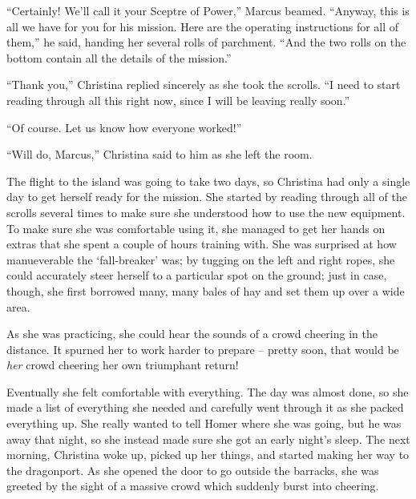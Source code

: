 \documentclass[showtrims,b6paper,draft,10pt]{memoir}
\begin{document}
``Certainly!  We'll call it your Sceptre of Power,''  Marcus beamed.  ``Anyway, this is all we have for you for his mission.  Here are the operating instructions for all of them,'' he said, handing her several rolls of parchment.  ``And the two rolls on the bottom contain all the details of the mission.''

``Thank you,'' Christina replied sincerely as she took the scrolls.  ``I need to start reading through all this right now, since I will be leaving really soon.''

``Of course.  Let us know how everyone worked!''

``Will do, Marcus,''  Christina said to him as she left the room.

\timeskip


The flight to the island was going to take two days, so Christina had only a single day to get herself ready for the mission.  She started by reading through all of the scrolls several times to make sure she understood how to use the new equipment.  To make sure she was comfortable using it, she managed to get her hands on extras that she spent a couple of hours training with.  She was surprised at how manueverable the `fall-breaker' was;  by tugging on the left and right ropes, she could accurately steer herself to a particular spot on the ground;  just in case, though, she first borrowed many, many bales of hay and set them up over a wide area.

As she was practicing, she could hear the sounds of a crowd cheering in the distance.  It spurned her to work harder to prepare -- pretty soon, that would be \emph{her} crowd cheering her own triumphant return!

Eventually she felt comfortable with everything.  The day was almost done, so she made a list of everything she needed and carefully went through it as she packed everything up.  She really wanted to tell Homer where she was going, but he was away that night, so she instead made sure she got an early night's sleep.
The next morning, Christina woke up, picked up her things, and started making her way to the dragonport.  As she opened the door to go outside the barracks, she was greeted by the sight of a massive crowd which suddenly burst into cheering.
\end{document}
